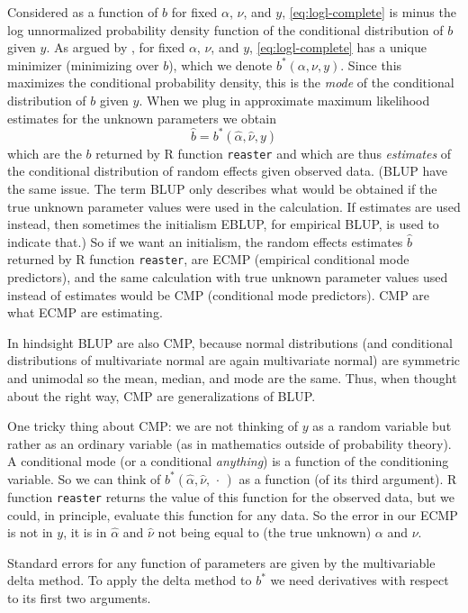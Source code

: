 \documentclass[11pt]{article}
\newcommand{\fatdot}{\,\cdot\,}
\let\code=\texttt
\begin{document}
Considered as a function of $b$ for fixed $\alpha$, $\nu$, and $y$,
\eqref{eq:logl-complete} is minus the log unnormalized probability density
function of the
conditional distribution of $b$ given $y$.  As argued by \citet{reaster},
for fixed $\alpha$, $\nu$, and $y$, \eqref{eq:logl-complete} has a unique
minimizer (minimizing over $b$), which we denote $b^*(\alpha, \nu, y)$.
Since this maximizes the conditional probability density, this is the
\emph{mode} of the conditional distribution of $b$ given $y$.
When we plug in approximate maximum likelihood estimates for the unknown
parameters we obtain
\begin{equation*}
   \hat{b} = b^*(\hat{\alpha}, \hat{\nu}, y)
\end{equation*}
which are the $b$ returned by R function \code{reaster} and which are thus
\emph{estimates} of the conditional distribution of random effects given
observed data.  (BLUP have the same issue.  The term BLUP only describes
what would be obtained if the true unknown parameter values were used in
the calculation.  If estimates are used instead, then sometimes the
initialism EBLUP, for empirical BLUP, is used to indicate that.)
So if we want an initialism, the random effects estimates $\hat{b}$ returned
by R function \code{reaster}, are ECMP (empirical conditional mode predictors),
and the same calculation with true unknown parameter values used instead
of estimates would be CMP (conditional mode predictors).
CMP are what ECMP are estimating.

In hindsight BLUP are also CMP, because normal distributions (and
conditional distributions of multivariate normal are again multivariate normal)
are symmetric and unimodal so the mean, median, and mode are the same.
Thus, when thought about the right way, CMP are generalizations of BLUP.

One tricky thing about CMP: we are not thinking of $y$ as a random variable
but rather as an ordinary variable (as in mathematics outside of probability
theory).  A conditional mode (or a conditional \emph{anything}) is a function
of the conditioning variable.
So we can think of $b^*(\hat{\alpha}, \hat{\nu}, \fatdot)$ as a function
(of its third argument).  R function \code{reaster} returns the value
of this function for the observed data, but we could, in principle, evaluate
this function for any data.  So the error in our ECMP is not in $y$, it is
in $\hat{\alpha}$ and $\hat{\nu}$ not being equal to (the true unknown)
$\alpha$ and $\nu$.

Standard errors for any function of parameters are given by the multivariable
delta method.  To apply the delta method to $b^*$ we need derivatives
with respect to its first two arguments.
\end{document}
